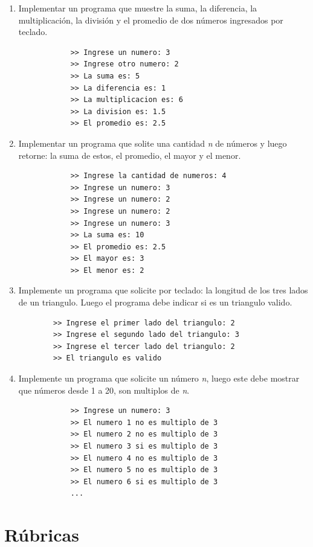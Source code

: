 \documentclass{article}
\begin{document}
	\begin{enumerate}
		\item Implementar un programa que muestre la suma, la diferencia, la multiplicación, la división y el promedio de dos números ingresados por teclado. 
			\begin{lstlisting}
			>> Ingrese un numero: 3
			>> Ingrese otro numero: 2
			>> La suma es: 5
			>> La diferencia es: 1
			>> La multiplicacion es: 6
			>> La division es: 1.5
			>> El promedio es: 2.5
			\end{lstlisting}

		\item Implementar un programa que solite una cantidad \textit{n} de números y luego retorne: la suma de estos, el promedio, el mayor y el menor.
		
			\begin{lstlisting}
			>> Ingrese la cantidad de numeros: 4
			>> Ingrese un numero: 3
			>> Ingrese un numero: 2
			>> Ingrese un numero: 2
			>> Ingrese un numero: 3
			>> La suma es: 10		
			>> El promedio es: 2.5
			>> El mayor es: 3
			>> El menor es: 2
			\end{lstlisting}
		
		\item Implemente un programa que solicite por teclado: la longitud de los tres lados de un triangulo. Luego el programa debe indicar si es un triangulo valido.
		
		\begin{lstlisting}
		>> Ingrese el primer lado del triangulo: 2
		>> Ingrese el segundo lado del triangulo: 3
		>> Ingrese el tercer lado del triangulo: 2
		>> El triangulo es valido
		\end{lstlisting}
		
		\item Implemente un programa que solicite un número \textit{n}, luego este debe mostrar que números desde 1 a 20, son multiplos de \textit{n}.
			
			\begin{lstlisting}
			>> Ingrese un numero: 3
			>> El numero 1 no es multiplo de 3
			>> El numero 2 no es multiplo de 3
			>> El numero 3 si es multiplo de 3
			>> El numero 4 no es multiplo de 3
			>> El numero 5 no es multiplo de 3
			>> El numero 6 si es multiplo de 3
			...
			\end{lstlisting}
	\end{enumerate}


	
\clearpage
	\section{Rúbricas}
	
\end{document}
